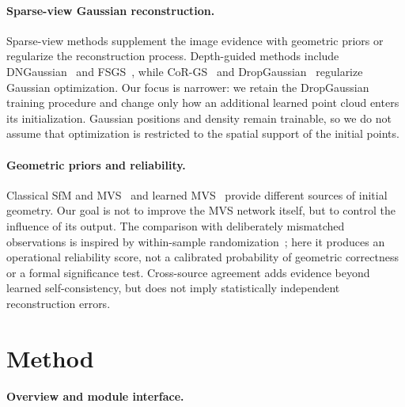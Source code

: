 \documentclass{article}
\begin{document}
\paragraph{Sparse-view Gaussian reconstruction.}
Sparse-view methods supplement the image evidence with geometric priors or regularize the reconstruction process. Depth-guided methods include DNGaussian~\citep{li2024dngaussian} and FSGS~\citep{zhu2024fsgs}, while CoR-GS~\citep{zhang2024corgs} and DropGaussian~\citep{park2025dropgaussian} regularize Gaussian optimization. Our focus is narrower: we retain the DropGaussian training procedure and change only how an additional learned point cloud enters its initialization. Gaussian positions and density remain trainable, so we do not assume that optimization is restricted to the spatial support of the initial points.

\paragraph{Geometric priors and reliability.}
Classical SfM and MVS~\citep{schoenberger2016sfm,schoenberger2016mvs} and learned MVS~\citep{izquierdo2025mvsanywhere} provide different sources of initial geometry. Our goal is not to improve the MVS network itself, but to control the influence of its output. The comparison with deliberately mismatched observations is inspired by within-sample randomization~\citep{good2005permutation}; here it produces an operational reliability score, not a calibrated probability of geometric correctness or a formal significance test. Cross-source agreement adds evidence beyond learned self-consistency, but does not imply statistically independent reconstruction errors.

\section{Method}
\label{sec:method}

\paragraph{Overview and module interface.}
\label{sec:overview}
\end{document}
